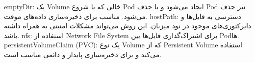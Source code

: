 emptyDir: یک Volume خالی که با شروع Pod ایجاد می‌شود و با حذف Pod نیز حذف می‌شود. مناسب برای ذخیره‌سازی داده‌های موقت.
hostPath: دسترسی به فایل‌ها و دایرکتوری‌های موجود در نود میزبان. این روش می‌تواند مشکلات امنیتی به همراه داشته باشد.
nfs: استفاده از Network File System برای اشتراک‌گذاری فایل‌ها بین Podها.
persistentVolumeClaim (PVC): یک نوع Volume که از Persistent Volume استفاده می‌کند و برای ذخیره‌سازی پایدار و دائمی مناسب است.




























